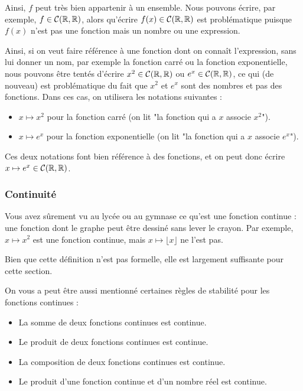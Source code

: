 Ainsi, $f$ peut très bien appartenir à un ensemble. Nous pouvons écrire, par exemple, $f \in \mathcal{C}(\mathbb{R},\mathbb{R})$, alors qu'écrire $f(x) \in \mathcal{C}(\mathbb{R},\mathbb{R})$ est problématique puisque $f(x)$ n'est pas une fonction mais un nombre ou une expression.

Ainsi, si on veut faire référence à une fonction dont on connaît l'expression, sans lui donner un nom, par exemple la fonction carré ou la fonction exponentielle, nous pouvons être tentés d'écrire $x^2 \in \mathcal{C}(\mathbb{R},\mathbb{R})$ ou $e^x \in \mathcal{C}(\mathbb{R},\mathbb{R})$, ce qui (de nouveau) est problématique du fait que $x^2$ et $e^x$ sont des nombres et pas des fonctions. Dans ces cas, on utilisera les notations suivantes :
\begin{itemize}
    \item $x \mapsto x^2$ pour la fonction carré (on lit "la fonction qui a $x$ associe $x^2$").
    \item $x \mapsto e^x$ pour la fonction exponentielle (on lit "la fonction qui a $x$ associe $e^x$").
\end{itemize}

Ces deux notations font bien référence à des fonctions, et on peut donc écrire $x \mapsto e^x \in \mathcal{C}(\mathbb{R},\mathbb{R})$.

\subsubsection{Continuité}
Vous avez sûrement vu au lycée ou au gymnase ce qu'est une fonction continue : une fonction dont le graphe peut être dessiné sans lever le crayon. Par exemple, $x \mapsto x^2$ est une fonction continue, mais $x \mapsto \lfloor x \rfloor$ ne l'est pas.

Bien que cette définition n'est pas formelle, elle est largement suffisante pour cette section.

On vous a peut être aussi mentionné certaines règles de stabilité pour les fonctions continues :

\begin{itemize}
    \item La somme de deux fonctions continues est continue.
    \item Le produit de deux fonctions continues est continue.
    \item La composition de deux fonctions continues est continue.
    \item Le produit d'une fonction continue et d'un nombre réel est continue.
\end{itemize}

